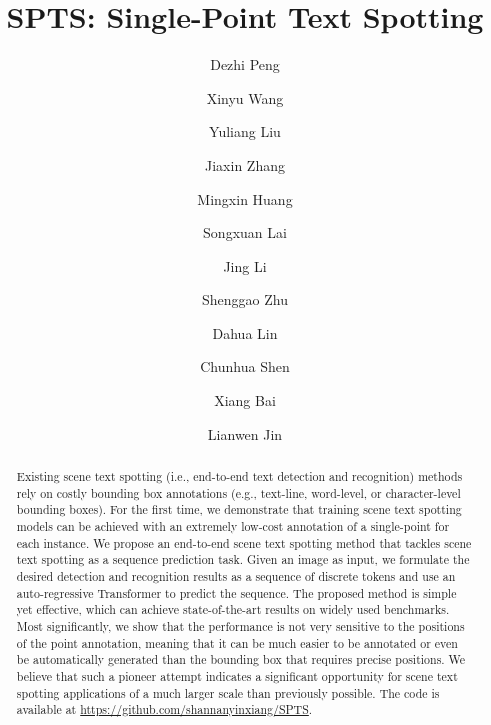 \documentclass[sigconf]{acmart}
\begin{document}
\title{SPTS: Single-Point Text Spotting}
















\author{Dezhi Peng}
\author{Xinyu Wang}
\author{Yuliang Liu}
\author{Jiaxin Zhang}
\author{Mingxin Huang}
\author{Songxuan Lai}
\author{Jing Li}
\author{Shenggao Zhu}
\author{Dahua Lin}
\author{Chunhua Shen}
\author{Xiang Bai}
\author{Lianwen Jin}
\authornotemark[1]


\def\authors{Dezhi Peng, Xinyu Wang, Yuliang Liu, et al}
\renewcommand{\shortauthors}{Dezhi Peng et al.}

\begin{abstract}
Existing scene text spotting (i.e., end-to-end text detection and recognition) methods rely on costly bounding box annotations (e.g., text-line, word-level, or character-level bounding boxes). For the first time, we demonstrate that training scene text spotting models can be achieved with an extremely low-cost annotation of a single-point for each instance. We propose an end-to-end scene text spotting method that tackles scene text spotting as a sequence prediction task. Given an image as input, we formulate the desired detection and recognition results as a sequence of discrete tokens and use an auto-regressive Transformer to predict the sequence. The proposed method is simple yet effective, which can achieve state-of-the-art results on widely used benchmarks. Most significantly, we show that the performance is not very sensitive to the positions of the point annotation, meaning that it can be much easier to be annotated or even be automatically generated than the bounding box that requires precise positions. We believe that such a pioneer attempt indicates a significant opportunity for scene text spotting applications of a much larger scale than previously possible. The code is available at \href{https://github.com/shannanyinxiang/SPTS}{https://github.com/shannanyinxiang/SPTS}. 
\end{abstract}
\end{document}
